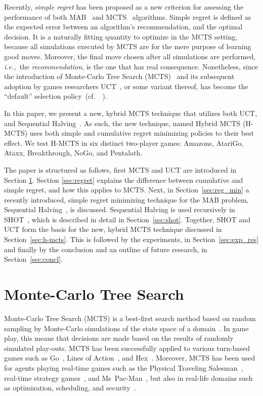 \documentclass[a4paper]{llncs}
\newcommand{\ie}{{\it i.e.,}~}
\newcommand{\cf}{{cf.}~}
\begin{document}
Recently, \emph{simple regret} has been proposed as a new criterion for assessing the performance of both MAB~\cite{audibert2010best,Bubeck11Pure} and MCTS~\cite{Cazenave14SHOT,Feldman12BRUE,tolpin2012mcts} algorithms. Simple regret is defined as the expected error between an algorithm's recommendation, and the optimal decision. It is a naturally fitting quantity to optimize in the MCTS setting, because all simulations executed by MCTS are for the mere purpose of learning good moves. Moreover, the final move chosen after all simulations are performed, \ie the \emph{recommendation}, is the one that has real consequence. Nonetheless, since the introduction of Monte-Carlo Tree Search (MCTS)~\cite{kocsis2006bandit} and its subsequent adoption by games researchers UCT~\cite{kocsis2006bandit}, or some variant thereof, has become the ``default'' selection policy~(\cf~\cite{browne2012survey}). 

\vspace{2mm}
In this paper, we present a new, hybrid MCTS technique that utilizes both UCT, and Sequential Halving~\cite{Karnin13SH}. As such, the new technique, named Hybrid MCTS (H-MCTS) uses both simple and cumulative regret minimizing policies to their best effect. We test H-MCTS in six distinct two-player games: Amazons, AtariGo, Ataxx, Breakthrough, NoGo, and Pentalath.

The paper is structured as follows, first MCTS and UCT are introduced in Section \ref{sec:mcts}. Section \ref{sec:regret} explains the difference between cumulative and simple regret, and how this applies to MCTS. Next, in Section~\ref{sec:reg_min} a recently introduced, simple regret minimizing technique for the MAB problem, Sequential Halving~\cite{Karnin13SH}, is discussed. Sequential Halving is used recursively in SHOT~\cite{Cazenave14SHOT}, which is described in detail in Section~\ref{sec:shot}. Together, SHOT and UCT form the basis for the new, hybrid MCTS technique discussed in Section~\ref{sec:h-mcts}. This is followed by the experiments, in Section~\ref{sec:exp_res} and finally by the conclusion and an outline of future research, in Section~\ref{sec:concl}.

\section{Monte-Carlo Tree Search}
\label{sec:mcts}

Monte-Carlo Tree Search (MCTS) is a best-first search method based on random sampling by Monte-Carlo simulations of the state space of a domain~\cite{coulom2007efficient,kocsis2006bandit}. In game play, this means that decisions are made based on the results of randomly simulated play-outs. MCTS has been successfully applied to various turn-based games such as Go~\cite{lee2010current}, Lines of Action~\cite{Winands2010b}, and Hex~\cite{arneson2010monte}. Moreover, MCTS has been used for agents playing real-time games such as the Physical Traveling Salesman~\cite{powleytsp}, real-time strategy games~\cite{balla2009uct}, and Ms~Pac-Man~\cite{realtime2014}, but also in real-life domains such as optimization, scheduling, and security~\cite{browne2012survey}.
\end{document}
